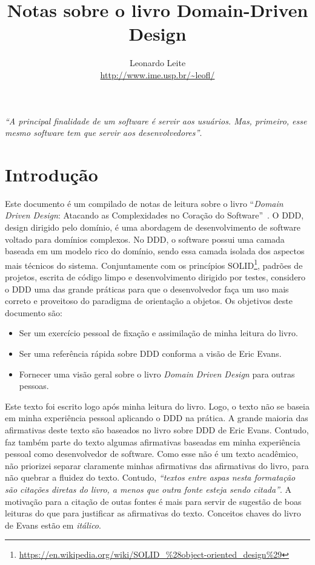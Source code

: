 \documentclass[a4paper, 12pt]{article}
\title{Notas sobre o livro Domain-Driven Design}
\author{Leonardo Leite \\ {\footnotesize \url{http://www.ime.usp.br/~leofl/}}}
\newcommand{\citacao}[1]{\emph{``#1''}}
\newcommand{\ddd}{\emph{Domain Driven Design}\xspace}
\begin{document}
\maketitle

\citacao{A principal finalidade de um software é servir aos usuários. Mas, primeiro, esse mesmo software tem que servir aos desenvolvedores}.

\section{Introdução}

Este documento é um compilado de notas de leitura sobre o livro ``\ddd: Atacando as Complexidades no Coração do Software''~\cite{Evans2003DDD}. O DDD, design dirigido pelo domínio, é uma abordagem de desenvolvimento de software voltado para domínios complexos. No DDD, o software possui uma camada baseada em um modelo rico do domínio, sendo essa camada isolada dos aspectos mais técnicos do sistema. Conjuntamente com os princípios SOLID\footnote{\url{https://en.wikipedia.org/wiki/SOLID_\%28object-oriented_design\%29}}, padrões de projetos, escrita de código limpo e desenvolvimento dirigido por testes, considero o DDD uma das grande práticas para que o desenvolvedor faça um uso mais correto e proveitoso do paradigma de orientação a objetos. Os objetivos deste documento são:

\begin{itemize}
\item Ser um exercício pessoal de fixação e assimilação de minha leitura do livro.
\item Ser uma referência rápida sobre DDD conforma a visão de Eric Evans.
\item Fornecer uma visão geral sobre o livro \ddd para outras pessoas.
\end{itemize}

Este texto foi escrito logo após minha leitura do livro. Logo, o texto não se baseia em minha experiência pessoal aplicando o DDD na prática. A grande maioria das afirmativas deste texto são baseados no livro sobre DDD de Eric Evans. Contudo, faz também parte do texto algumas afirmativas baseadas em minha experiência pessoal como desenvolvedor de software. Como esse não é um texto acadêmico, não priorizei separar claramente minhas afirmativas das afirmativas do livro, para não quebrar a fluidez do texto. Contudo, \citacao{textos entre aspas nesta formatação são citações diretas do livro, a menos que outra fonte esteja sendo citada}. A motivação para a citação de outas fontes é mais para servir de sugestão de boas leituras do que para justificar as afirmativas do texto. Conceitos chaves do livro de Evans estão em \emph{itálico}.
\end{document}
